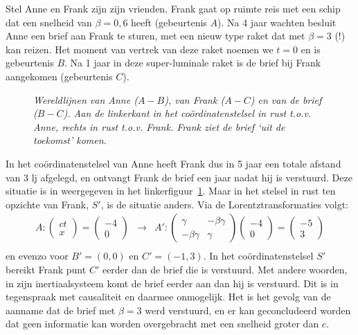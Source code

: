 Stel Anne en Frank zijn zijn vrienden. Frank gaat op ruimte reis met
een schip dat een snelheid van $\beta=0,6$ heeft (gebeurtenis $A$).  Na 4 jaar wachten
besluit Anne een brief aan Frank te sturen, met een nieuw type raket dat met
$\beta=3$ (!) kan reizen. Het moment van vertrek van deze raket noemen we $t=0$ en is gebeurtenis $B$.
Na 1 jaar in deze super-luminale raket is de brief bij Frank aangekomen (gebeurtenis $C$).

\begin{figure}[ht] 
\centering
\caption{{\sl \label{f:grid3} Wereldlijnen van Anne ($A-B$), van Frank
($A-C$) en van de brief ($B-C$). Aan de linkerkant in het
co\"ordinatenstelsel in rust t.o.v. Anne, rechts in rust t.o.v. Frank. Frank
ziet de brief `uit de toekomst' komen.}}
\end{figure}


In het co\"ordinatenstelsel van Anne heeft Frank dus in 5 jaar een
totale afstand van 3 lj afgelegd, en ontvangt Frank de brief een jaar
nadat hij is verstuurd. Deze situatie is in weergegeven in het
linkerfiguur~\ref{f:grid3}. Maar in het stelsel in rust ten opzichte
van Frank, $S'$, is de situatie anders. Via de Lorentztransformaties
volgt:
\begin{eqnarray}\nonumber
A: \left( \begin{array}{c} ct \\ x \end{array} \right) = 
  \left( \begin{array}{c} -4 \\ 0 \end{array} \right) & \rightarrow & A': 
\left( \begin{array}{cc} \gamma & -\beta\gamma \\ -\beta\gamma & \gamma \end{array} \right)  
\left( \begin{array}{c} -4 \\ 0 \end{array} \right) = 
\left( \begin{array}{c} -5 \\ 3 \end{array} \right)  \\\nonumber
\end{eqnarray}
en evenzo voor $B'=(0,0)$ en $C'=(-1,3)$. In het co\"ordinatenstelsel
$S'$ bereikt Frank punt $C'$ eerder dan de brief die is verstuurd. Met
andere woorden, in zijn inertiaalsysteem komt de brief eerder aan dan
hij is verstuurd. Dit is in tegenspraak met causaliteit en daarmee
onmogelijk. Het is het gevolg van de aanname dat de brief met
$\beta=3$ werd verstuurd, en er kan geconcludeerd worden dat geen
informatie kan worden overgebracht met een snelheid groter dan $c$.

